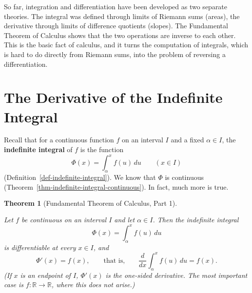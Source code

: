 \documentclass[
  letterpaper,
  DIV=11,
  numbers=noendperiod]{scrreprt}
\theoremstyle{plain}
\theoremstyle{plain}
\theoremstyle{definition}
\theoremstyle{definition}
\theoremstyle{definition}
\theoremstyle{plain}
\newtheorem{theorem}{Theorem}[chapter]
\theoremstyle{plain}
\theoremstyle{remark}
\begin{document}
So far, integration and differentiation have been developed as two
separate theories. The integral was defined through limits of Riemann
sums (areas), the derivative through limits of difference quotients
(slopes). The Fundamental Theorem of Calculus shows that the two
operations are inverse to each other. This is the basic fact of
calculus, and it turns the computation of integrals, which is hard to do
directly from Riemann sums, into the problem of reversing a
differentiation.

\section{The Derivative of the Indefinite
Integral}\label{the-derivative-of-the-indefinite-integral}

Recall that for a continuous function \(f\) on an interval \(I\) and a
fixed \(\alpha\in I\), the \textbf{indefinite integral} of \(f\) is the
function \[
\Phi(x) = \int_\alpha^x f(u)\,du \qquad (x\in I)
\] (Definition~\ref{def-indefinite-integral}). We know that \(\Phi\) is
continuous (Theorem~\ref{thm-indefinite-integral-continuous}). In fact,
much more is true.

\begin{theorem}[Fundamental Theorem of Calculus, Part
1]\protect\hypertarget{thm-ftc-1}{}\label{thm-ftc-1}

Let \(f\) be continuous on an interval \(I\) and let \(\alpha\in I\).
Then the indefinite integral \[
\Phi(x) = \int_\alpha^x f(u)\,du
\] is differentiable at every \(x\in I\), and \[
\Phi'(x) = f(x),
\qquad\text{that is,}\qquad
\frac{d}{dx}\int_\alpha^x f(u)\,du = f(x).
\] (If \(x\) is an endpoint of \(I\), \(\Phi'(x)\) is the one-sided
derivative. The most important case is
\(f\colon\mathbb{R}\to\mathbb{R}\), where this does not arise.)

\end{theorem}
\end{document}
